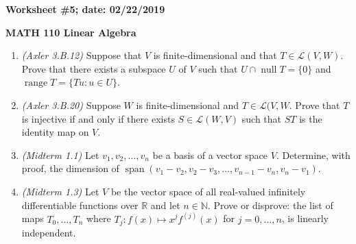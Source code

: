 \documentclass{article}
\newcommand{\RR}{\mathbb{R}}
\newcommand{\NN}{\mathbb{N}}
\DeclareMathOperator*{\opnull}{null}
\DeclareMathOperator*{\range}{range}
\DeclareMathOperator*{\opspan}{span}
\begin{document}
{\bf Worksheet \#5; date: 02/22/2019}

{\bf MATH 110 Linear Algebra}

\begin{enumerate}
\item {\em (Axler 3.B.12)} Suppose that $V$ is finite-dimensional and that $T \in \mathcal{L}(V, W)$. Prove that there exists a subspace $U$ of $V$ such that $U \cap \opnull T = \{0\}$ and $\range T = \{Tu: u \in U\}$.

\item {\em (Axler 3.B.20)} Suppose $W$ is finite-dimensional and $T \in \mathcal{L}(V, W$. Prove that $T$ is injective if and only if there exists $S \in \mathcal{L}(W, V)$ such that $ST$ is the identity map on $V$.

\item {\em (Midterm 1.1)} Let $v_1, v_2, \ldots, v_n$ be a basis of a vector space $V$. Determine, with proof, the dimension of $\opspan(v_1 - v_2, v_2 - v_3, \ldots, v_{n-1} - v_n, v_n - v_1)$.

\item {\em (Midterm 1.3)} Let $V$ be the vector space of all real-valued infinitely differentiable functions over $\RR$ and let $n \in \NN$. Prove or disprove: the list of maps $T_0, \ldots, T_n$ where $T_j: f(x) \mapsto x^j f^{(j)}(x)$ for $j = 0, \ldots, n$, is linearly independent.
\end{enumerate}
\end{document}
